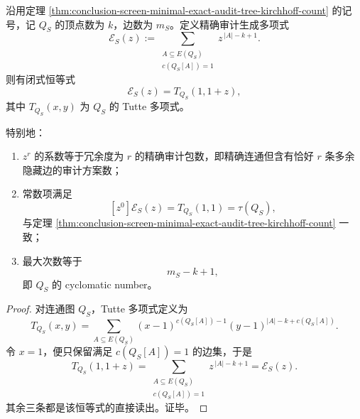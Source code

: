 \begin{theorem}\label{thm:conclusion-screen-exact-audit-tutte-generator}
沿用定理 \ref{thm:conclusion-screen-minimal-exact-audit-tree-kirchhoff-count} 的记号，记 \(Q_S\) 的顶点数为 \(k\)，边数为 \(m_S\)。定义精确审计生成多项式
\[
\mathcal E_S(z)
:=
\sum_{\substack{A\subseteq E(Q_S)\\ c(Q_S[A])=1}}
z^{\,|A|-k+1}.
\]
则有闭式恒等式
\[
\mathcal E_S(z)=T_{Q_S}(1,1+z),
\]
其中 \(T_{Q_S}(x,y)\) 为 \(Q_S\) 的 Tutte 多项式。

特别地：
\begin{enumerate}
  \item \(z^r\) 的系数等于冗余度为 \(r\) 的精确审计包数，即精确连通但含有恰好 \(r\) 条多余隐藏边的审计方案数；
  \item 常数项满足
        \[
        [z^0]\mathcal E_S(z)=T_{Q_S}(1,1)=\tau(Q_S),
        \]
        与定理 \ref{thm:conclusion-screen-minimal-exact-audit-tree-kirchhoff-count} 一致；
  \item 最大次数等于
        \[
        m_S-k+1,
        \]
        即 \(Q_S\) 的 cyclomatic number。
\end{enumerate}
\end{theorem}
\begin{proof}
对连通图 \(Q_S\)，Tutte 多项式定义为
\[
T_{Q_S}(x,y)=
\sum_{A\subseteq E(Q_S)}
(x-1)^{c(Q_S[A])-1}(y-1)^{|A|-k+c(Q_S[A])}.
\]
令 \(x=1\)，便只保留满足 \(c(Q_S[A])=1\) 的边集，于是
\[
T_{Q_S}(1,1+z)
=
\sum_{\substack{A\subseteq E(Q_S)\\ c(Q_S[A])=1}}
z^{\,|A|-k+1}
=
\mathcal E_S(z).
\]
其余三条都是该恒等式的直接读出。证毕。
\end{proof}

